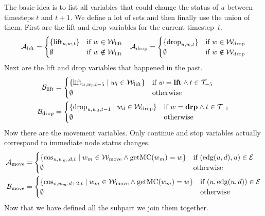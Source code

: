 The basic idea is to list all variables that could change the status of $u$
between timesteps $t$ and $t+1$. We define a lot of sets and then finally use
the union of them. First are the lift and drop variables for the
current timestep~$t$.
\begin{align}
    &\mathcal{A}_{\mathrm{lift}} = \begin{cases}
        \{\mathrm{lift}_{u,w,t}\} &\text{if}\  w \in \mathcal{W}_\mathrm{lift}\\
        \emptyset &\text{if}\  w \notin \mathcal{W}_\mathrm{lift}
    \end{cases}
    &\mathcal{A}_{\mathrm{drop}} = \begin{cases}
        \{\mathrm{drop}_{u,w,t}\} &\text{if}\  w \in \mathcal{W}_\mathrm{drop}\\
        \emptyset &\text{if}\  w \notin \mathcal{W}_\mathrm{drop}
    \end{cases}
\end{align}
Next are the lift and drop variables that happened in the past.
\begin{align}
    \mathcal{B}_{\mathrm{lift}} &= \begin{cases}
        \{\mathrm{lift}_{u,w_l,t-5} \mid w_l \in \mathcal{W}_\mathrm{lift}\} &\text{if}\  w = \text{\bf lft} \wedge
        t \in \mathcal{T}_{-5}\\
        \emptyset &\text{otherwise}
    \end{cases}\\
    \mathcal{B}_{\mathrm{drop}} &= \begin{cases}
        \{\mathrm{drop}_{u,w_d,t-1} \mid w_d \in \mathcal{W}_\mathrm{drop}\} &\text{if}\  w = \text{\bf drp} \wedge
        t \in \mathcal{T}_{-1}\\
        \emptyset &\text{otherwise}
    \end{cases}
\end{align}
Now there are the movement variables. Only continue and stop variables actually
correspond to immediate node status changes.
\begin{align}
    \mathcal{A}_{\mathrm{move}} &= \begin{cases}
        \{\mathrm{cos}_{u,w_m,d,t} \mid w_m \in \mathcal{W}_\mathrm{move} \wedge \mathrm{getMC}(w_m) = w\} &\text{if}\ 
        (\mathrm{edg}(u,d),u) \in \mathcal{E}\\
        \emptyset &\text{otherwise}
    \end{cases}\\
    \mathcal{B}_{\mathrm{move}} &= \begin{cases}
        \{\mathrm{cos}_{v,w_m,d+2,t} \mid w_m \in \mathcal{W}_\mathrm{move} \wedge \mathrm{getMC}(w_m) = w\} &\text{if}\ 
        (u,\mathrm{edg}(u,d)) \in \mathcal{E}\\
        \emptyset &\text{otherwise}
    \end{cases}
\end{align}
Now that we have defined all the subpart we join them together.
